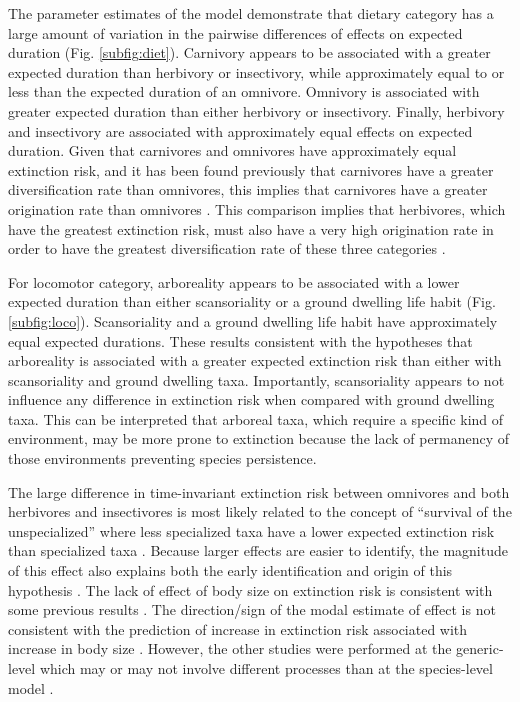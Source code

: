 \documentclass{nature}
\begin{document}
The parameter estimates of the model demonstrate that dietary category has a large amount of variation in the pairwise differences of effects on expected duration (Fig. \ref{subfig:diet}). Carnivory appears to be associated with a greater expected duration than herbivory or insectivory, while approximately equal to or less than the expected duration of an omnivore. Omnivory is associated with greater expected duration than either herbivory or insectivory. Finally, herbivory and insectivory are associated with approximately equal effects on expected duration. 
Given that carnivores and omnivores have approximately equal extinction risk, and it has been found previously that carnivores have a greater diversification rate than omnivores, this implies that carnivores have a greater origination rate than omnivores \cite{Price2012}. This comparison implies that herbivores, which have the greatest extinction risk, must also have a very high origination rate in order to have the greatest diversification rate of these three categories \cite{Price2012}. 

For locomotor category, arboreality appears to be associated with a lower expected duration than either scansoriality or a ground dwelling life habit (Fig. \ref{subfig:loco}). Scansoriality and a ground dwelling life habit have approximately equal expected durations. These results consistent with the hypotheses that arboreality is associated with a greater expected extinction risk than either with scansoriality and ground dwelling taxa. Importantly, scansoriality appears to not influence any difference in extinction risk when compared with ground dwelling taxa. This can be interpreted that arboreal taxa, which require a specific kind of environment, may be more prone to extinction because the lack of permanency of those environments preventing species persistence. 

The large difference in time-invariant extinction risk between omnivores and both herbivores and insectivores is most likely related to the concept of ``survival of the unspecialized'' where less specialized taxa have a lower expected extinction risk than specialized taxa \cite{Liow2004a,Simpson1944}. Because larger effects are easier to identify, the magnitude of this effect also explains both the early identification and origin of this hypothesis \cite{Simpson1944}. The lack of effect of body size on extinction risk is consistent with some previous results \cite{Tomiya2013}. The direction/sign of the modal estimate of effect is not consistent with the prediction of increase in extinction risk associated with increase in body size \cite{Liow2008}. However, the other studies were performed at the generic-level which may or may not involve different processes than at the species-level model \cite{Tomiya2013,Liow2008}.
\end{document}
